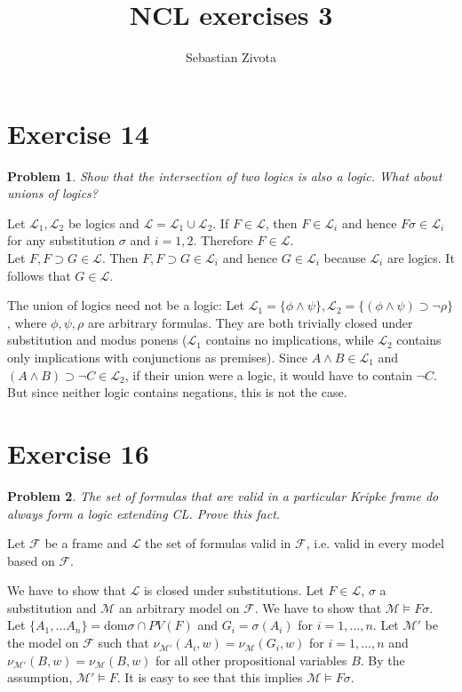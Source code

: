 \documentclass[a4paper,10pt]{article}
\title{NCL exercises 3}
\author{Sebastian Zivota}
\newcommand{\imp}{\supset}
\newcommand{\F}{\mathcal{F}}
\renewcommand{\L}{\mathcal{L}}
\newcommand{\M}{\mathcal{M}}
\newcommand{\dom}{\mathrm{dom}}
\newtheorem*{problem*}{Problem}
\theoremstyle{definition}
\begin{document}
\maketitle

\section*{Exercise 14}

\begin{problem*}
Show that the intersection of two logics is also a logic.
What about unions of logics?

\end{problem*}
Let $\L_1, \L_2$ be logics and $\L = \L_1 ∪ \L_2$. If $F \in \L$, then $F \in \L_i$ and hence $Fσ \in \L_i$ for any substitution $σ$ and $i = 1,2$. Therefore $F \in \L$.\\
Let $F, F \imp G \in \L$. Then $F, F \imp G \in \L_i$ and hence $G \in \L_i$ because $\L_i$ are logics. It follows that $G \in \L$.

The union of logics need not be a logic: Let $\L_1 = \{ϕ ∧ ψ \}, \L_2 = \{(ϕ ∧ ψ) \imp ¬ρ \}$, where $ϕ, ψ, ρ$ are arbitrary formulas. They are both trivially closed under substitution and modus ponens ($\L_1$ contains no implications, while $\L_2$ contains only implications with conjunctions as premises). Since $A ∧ B \in \L_1$ and $(A ∧ B) \imp ¬ C \in \L_2$, if their union were a logic, it would have to contain $¬C$. But since neither logic contains negations, this is not the case.
\section*{Exercise 16}
\begin{problem*}
The set of formulas that are valid in a particular Kripke frame do always form a logic extending CL. Prove this fact.
\end{problem*}
Let $\F$ be a frame and $\L$ the set of formulas valid in $\F$, i.e. valid in every model based on $\F$.

We have to show that $\L$ is closed under substitutions. Let $F \in \L$, $σ$ a substitution and $\M$ an arbitrary model on $\F$. We have to show that $\M \models Fσ$. Let $\{A_1,…A_n\} = \dom σ ∩ PV(F)$ and $G_i = σ(A_i)$ for $i = 1,…,n$. Let $\M'$ be the model on $\F$ such that $ν_{\M'}(A_i, w) = ν_{\M}(G_i, w)$ for $i = 1,…,n$ and $ν_{\M'}(B, w) = ν_{\M}(B,w)$ for all other propositional variables $B$. By the assumption, $\M' \models F$. It is easy to see that this implies $\M \models Fσ$.
\end{document}
